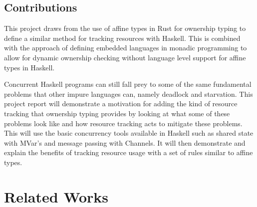 \documentclass[onehalf,11pt]{beavtex}
\begin{document}
\section{Contributions}

This project draws from the use of affine types in Rust for
ownership typing to define a similar method for tracking resources with Haskell.
This is combined with the approach of defining embedded languages in monadic
programming to allow for dynamic ownership checking without language level
support for affine types in Haskell.

Concurrent Haskell programs can still fall prey to some of the same fundamental
problems that other impure languages can, namely deadlock and starvation.
This project report will demonstrate a motivation for adding the kind of
resource tracking that ownership typing provides by looking at what some of
these problems look like and how resource tracking acts to mitigate these
problems.  This will use the basic concurrency tools available in Haskell
such as shared state with MVar's and message passing with Channels.
It will then demonstrate and explain the benefits of tracking resource usage
with a set of rules similar to affine types.





\chapter{Related Works}
\end{document}
